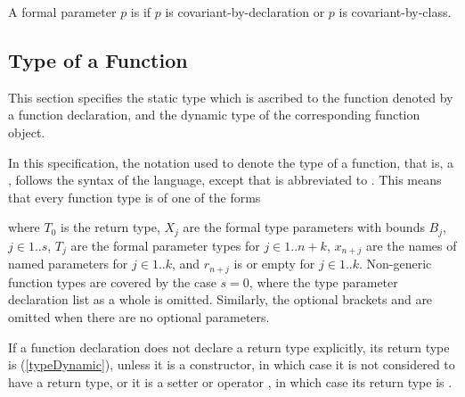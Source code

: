 \documentclass[makeidx]{article}
\begin{document}
\LMHash{}%
A formal parameter $p$ is
if $p$ is covariant-by-declaration or $p$ is covariant-by-class.



\subsection{Type of a Function}

\LMHash{}%
This section specifies the static type which is ascribed to
the function denoted by a function declaration,
and the dynamic type of the corresponding function object.

\LMHash{}%
In this specification,
the notation used to denote the type of a function,
that is, a ,
follows the syntax of the language,
except that \EXTENDS{} is abbreviated to
\FunctionTypeExtends.
This means that every function type is of one of the forms

\noindent
where $T_0$ is the return type,
$X_j$ are the formal type parameters with bounds $B_j$, $j \in 1 .. s$,
$T_j$ are the formal parameter types for $j \in 1 .. n + k$,
$x_{n+j}$ are the names of named parameters for $j \in 1 .. k$,
and $r_{n+j}$ is \REQUIRED{} or empty for  $j \in 1 .. k$.
Non-generic function types are covered by the case $s = 0$,
where the type parameter declaration list
\code{<\ldots{}>}
as a whole is omitted.
%
Similarly, the optional brackets \code{[]} and \code{\{\}} are omitted
when there are no optional parameters.


\LMHash{}%
If a function declaration does not declare a return type explicitly,
its return type is \DYNAMIC{} (\ref{typeDynamic}),
unless it is a constructor,
in which case it is not considered to have a return type,
or it is a setter or operator \code{[]=},
in which case its return type is \VOID.
\end{document}
